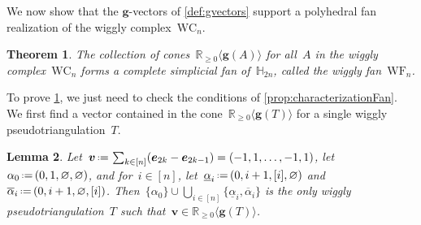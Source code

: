 \documentclass{amsart}
\newtheorem{theorem}{Theorem}%
\newtheorem{lemma}[theorem]{Lemma}
\theoremstyle{definition}
\newcommand{\R}{\mathbb{R}} %
\newcommand{\HH}{\mathbb{H}} %
\renewcommand{\b}[1]{{\boldsymbol{#1}}} %
\newcommand{\eqdef}{\mbox{\,\raisebox{0.2ex}{\scriptsize\ensuremath{\mathrm:}}\ensuremath{=}\,}} %
\newcommand{\darkblue}{\color{darkblue}} %
\newcommand{\defn}[1]{\textsl{\darkblue #1}} %
\newcommand{\wigglyComplex}{\mathrm{WC}} %
\newcommand{\wigglyFan}{\mathrm{WF}} %
\begin{document}
We now show that the $\b{g}$-vectors of \cref{def:gvectors} support a polyhedral fan realization of the wiggly complex~$\wigglyComplex_n$.

\begin{theorem}
\label{thm:wigglyFan}
The collection of cones~$\R_{\ge 0} \langle \b{g}(A) \rangle$ for all~$A$ in the wiggly complex~$\wigglyComplex_n$ forms a complete simplicial fan of~$\HH_{2n}$, called the \defn{wiggly fan}~$\wigglyFan_n$.
\end{theorem}

To prove \cref{thm:wigglyFan}, we just need to check the conditions of \cref{prop:characterizationFan}.
We first find a vector contained in the cone~$\R_{\ge 0} \langle \b{g}(T) \rangle$ for a single wiggly pseudotriangulation~$T$.

\begin{lemma}
\label{lem:-+...-+}
Let~$\b{v} \eqdef \sum_{k \in [n]} (\b{e}_{2k} - \b{e}_{2k-1}) = (-1, 1, \dots, -1, 1)$, let~$\alpha_0 \eqdef (0, 1, \varnothing, \varnothing)$, and for~${i \in [n]}$, let~$\underline{\alpha}_i \eqdef (0, i+1, [i], \varnothing)$ and~$\overline{\alpha}_i \eqdef (0, i+1, \varnothing, [i])$.
Then~$\{\alpha_0\} \cup \bigcup_{i \in [n]} \{\underline{\alpha}_i, \overline{\alpha}_i\}$ is the only wiggly pseudotriangulation~$T$ such that~$\b{v} \in \R_{\ge 0} \langle \b{g}(T) \rangle$.
\end{lemma}
\end{document}
